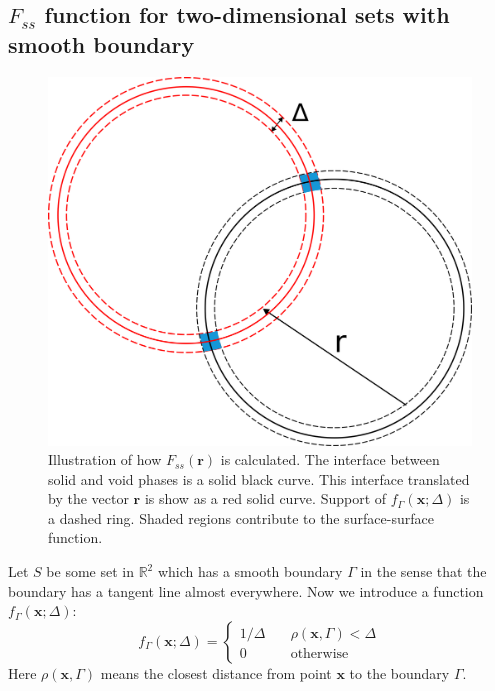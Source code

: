\documentclass[1p]{elsarticle}
\begin{document}
\subsection{$F_{ss}$ function for two-dimensional sets with smooth boundary}
\label{sec:fss-2d}
\begin{figure}
  \centering
  \includegraphics[width=0.8\linewidth]{images/Fss.png}
  \caption[]{Illustration of how $F_{ss}(\bm{r})$ is calculated. The interface
    between solid and void phases is a solid black curve. This interface
    translated by the vector $\bm{r}$ is show as a red solid curve. Support of
    $f_\Gamma(\bm{x}; \Delta)$ is a dashed ring. Shaded regions contribute to
    the surface-surface function.}
  \label{fig:Fss-explained}
\end{figure}
Let $S$ be some set in $\mathbb{R}^2$ which has a smooth boundary $\Gamma$ in
the sense that the boundary has a tangent line almost everywhere. Now we
introduce a function $f_\Gamma(\bm{x}; \Delta)$:
\begin{equation}
  f_\Gamma(\bm{x}; \Delta) = \left\{
  \begin{array}{ll}
    1/\Delta & \quad \rho(\bm{x}, \Gamma) < \Delta \\
    0 & \quad \text{otherwise}
  \end{array}
  \right. \label{eq:delta-sequence}
\end{equation}
Here $\rho(\bm{x}, \Gamma)$ means the closest distance from point $\bm{x}$ to the
boundary $\Gamma$.
\end{document}
